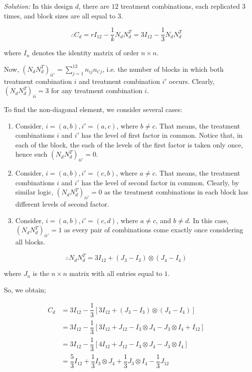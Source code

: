 \documentclass[12pt]{article}
\theoremstyle{definition}
\newenvironment{answer}{\textit{Solution: }\quad }{ \hfill \qedsymbol}
\begin{document}
\begin{answer}
	In this design $d$, there are $12$ treatment combinations, each replicated $3$ times, and block sizes are all equal to $3$. 

	$$\therefore C_d = r I_{12} - \dfrac{1}{k} N_d N_d^T = 3 I_{12} - \dfrac{1}{3} N_d N_d^{T}$$

	where $I_n$ denotes the identity matrix of order $n \times n$.

	Now, $(N_d N_d^T)_{ii'} = \sum_{j = 1}^{12} n_{ij}n_{i'j}$, i.e. the number of blocks in which both treatment combination $i$ and treatment combination $i'$ occurs. Clearly, $(N_d N_d^T)_{ii} = 3$ for any treatment combination $i$. 

	To find the non-diagonal element, we consider several cases:

	\begin{enumerate}
		\item Consider, $i = (a,b), i' = (a, c)$, where $b \neq c$. That means, the treatment combinations $i$ and $i'$ has the level of first factor in common. Notice that, in each of the block, the each of the levels of the first factor is taken only once, hence such $(N_d N_d^T)_{ii'} = 0$.
		\item Consider, $i = (a,b), i' = (c, b)$, where $a \neq c$. That means, the treatment combinations $i$ and $i'$ has the level of second factor in common. Clearly, by similar logic, $(N_d N_d^T)_{ii'} = 0$ as the treatment combinations in each block has different levels of second factor.
		\item Consider, $i = (a, b), i' = (c, d)$, where $a \neq c$, and $b \neq d$. In this case, $(N_d N_d^T)_{ii'} = 1$ as every pair of combinations come exactly once considering all blocks.
	\end{enumerate}

	$$\therefore N_d N_d^T = 3 I_{12} + (J_3 - I_3) \otimes (J_4 - I_4)$$

	where $J_n$ is the $n \times n$ matrix with all entries equal to $1$.

	So, we obtain;

	\begin{align*}
		C_d 
		& = 3I_{12} - \dfrac{1}{3} \left[ 3 I_{12} + (J_3 - I_3) \otimes (J_4 - I_4) \right] \\
		& = 3 I_{12} - \dfrac{1}{3} \left[ 3I_{12} + J_{12} - I_3 \otimes J_4 - J_3 \otimes I_4 + I_{12} \right]\\
		& = 3 I_{12} - \dfrac{1}{3} \left[ 4I_{12} + J_{12} - I_3 \otimes J_4 - J_3 \otimes I_4  \right]\\
		& = \dfrac{5}{3} I_{12} + \dfrac{1}{3} I_3 \otimes J_4 + \dfrac{1}{3} J_3 \otimes I_4 - \dfrac{1}{3} J_{12}\\
	\end{align*}


\end{answer}
\end{document}

